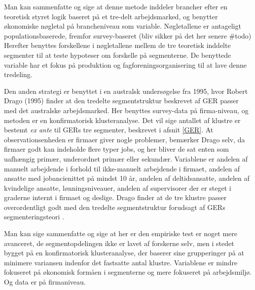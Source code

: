 Man kan sammenfatte og sige at denne metode inddeler brancher efter en teoretisk styret logik baseret på et tre-delt arbejdsmarked, og benytter økonomiske nøgletal på brancheniveau som variable. Nøgletallene er antageligt populationsbaserede, fremfor survey-baseret (bliv sikker på det her senere \#todo) Herefter benyttes forskellene i nøgletallene mellem de tre teoretisk inddelte segmenter til at teste hypoteser om forskelle på segmenterne. De benyttede variable har et fokus på produktion og fagforeningsorganisering til at lave denne tredeling.  

Den anden strategi er benyttet i en australsk undersøgelse fra 1995, hvor Robert Drago (1995) finder at den tredelte segmentstruktur beskrevet af GER passer med det australske arbejdsmarked. Her benyttes survey-data på firma-niveau, og metoden er en  konfirmatorisk klusteranalyse. Det vil sige antallet af klustre er bestemt \emph{ex ante} til GERs tre segmenter, beskrevet i afsnit \ref{GER}. At observationsenheden er firmaer giver nogle problemer, bemærker Drago selv, da firmaer godt kan indeholde flere typer jobs, og her bliver de sat enten som uafhængig primær, underordnet primær eller sekundær. Variablene er andelen af manuelt arbejdende i forhold til ikke-manuelt arbejdende i firmaet, andelen af ansatte med jobancienittet på mindst 10 år, andelen af deltidsansatte, andelen af kvindelige ansatte, lønningsniveauer, andelen af supervisorer der er steget i graderne internt i firmaet og deslige. Drago finder at de tre klustre passer overordentligt godt med den tredelte segmentstruktur forudsagt af GERs segmenteringsteori \parencite[59]{Drago1995}. 

Man kan sige sammenfatte og sige at her er den empiriske test er noget mere avanceret, de segmentopdelingen ikke er lavet af forskerne selv, men i stedet bygget på en konfirmatorisk klusteranalyse, der baserer sine grupperinger på at minimere variansen indenfor det fastsatte antal klustre. Variablene er mindre fokuseret på økonomisk formåen i segmenterne og mere fokuseret på arbejdsmiljø. Og data er på firmaniveau. 

